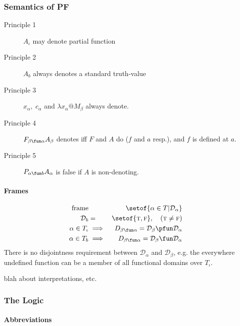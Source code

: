 \subsubsection{Semantics of PF}

\begin{description}
  \item[Principle 1]
    $A_\iota$ may denote partial function
  \item[Principle 2]
    $A_b$ always denotes a standard truth-value
  \item[Principle 3]
    $x_\alpha,\;c_\alpha$ and $\lambda x_\alpha @ M_\beta$ always denote.
  \item[Principle 4]
    $F_{\beta\fun\alpha}A_\beta$ denotes iff $F$ and $A$ do ($f$ and $a$ resp.),
    and $f$ is defined at $a$.
  \item[Principle 5]
    $P_{\alpha\fun b}A_\alpha$ is false if $A$ is non-denoting.
\end{description}

\paragraph{Frames}

\def\D{\mathcal{D}}
\def\F{\textsc{f}}
\def\T{\textsc{t}}
\begin{eqnarray*}
  \mbox{frame} && \setof{ \alpha \in T | \D_\alpha }
\\ \D_b &=& \setof{ \T,\F }, \quad ( \T \neq \F )
\\ \alpha \in T_\iota &\implies& D_{\beta\fun\alpha} = \D_{\beta} \pfun \D_\alpha
\\ \alpha \in T_b &\implies& D_{\beta\fun\alpha} = \D_{\beta} \fun \D_\alpha
\end{eqnarray*}
There is no disjointness requirement between $\D_\alpha$ and $\D_\beta$,
e.g. the everywhere undefined function can be a member of all functional
domains over $T_\iota$.

blah about interpretations, etc.

\subsubsection{The Logic}

\def\TT{\mathbf{T}}
\def\FF{\mathbf{F}}

\paragraph{Abbreviations}

